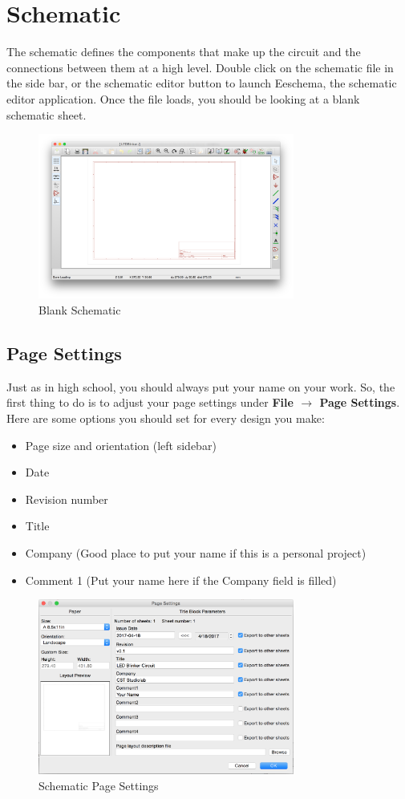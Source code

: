 \documentclass[12pt, oneside]{article}
\begin{document}
\section{Schematic}
The schematic defines the components that make up the circuit and the connections between them at a high level. Double click on the schematic file in the side bar, or the schematic editor button to launch Eeschema, the schematic editor application. Once the file loads, you should be looking at a blank schematic sheet.

\begin{figure}[H]
\includegraphics[width=0.75\textwidth]{BlankSchematic}
\centering
\caption{Blank Schematic}
\end{figure}

\subsection{Page Settings}
Just as in high school, you should always put your name on your work. So, the first thing to do is to adjust your page settings under \textbf{File $\rightarrow$ Page Settings}. Here are some options you should set for every design you make:
\begin{itemize}
	\item Page size and orientation (left sidebar)
	\item Date
	\item Revision number
	\item Title
	\item Company (Good place to put your name if this is a personal project)
	\item Comment 1 (Put your name here if the Company field is filled)
\end{itemize}

\begin{figure}[H]
\includegraphics[width=0.75\textwidth]{PageSettings}
\centering
\caption{Schematic Page Settings}
\end{figure}
\end{document}
